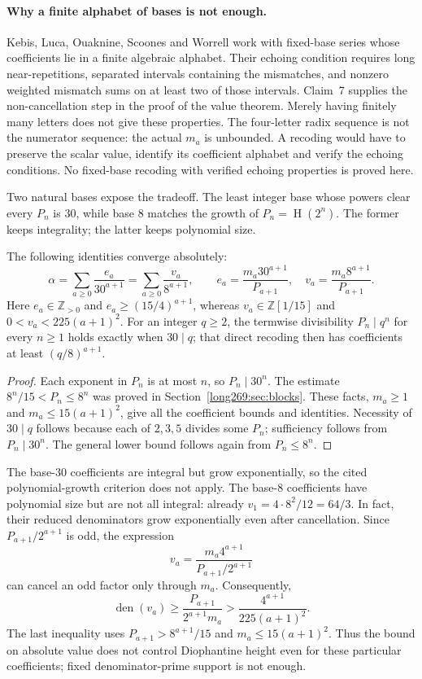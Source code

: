 \documentclass[11pt]{article}
\theoremstyle{remark}
\theoremstyle{plain}
\newcommand{\hgt}{\operatorname{H}}
\begin{document}
\paragraph{Why a finite alphabet of bases is not enough.}
Kebis, Luca, Ouaknine, Scoones and Worrell
\cite[Definition~3, Theorem~6 and Claim~7]{kebis2024echoing}
work with fixed-base series whose coefficients lie in a finite algebraic
alphabet.  Their echoing condition requires long near-repetitions,
separated intervals containing the mismatches, and nonzero weighted
mismatch sums on at least two of those intervals.  Claim~7 supplies the
non-cancellation step in the proof of the value theorem.  Merely having
finitely many letters does not give these properties.
The four-letter radix sequence is not the numerator sequence: the actual
$m_a$ is unbounded.  A recoding would have to preserve the scalar value,
identify its coefficient alphabet and verify the echoing conditions.
No fixed-base recoding with verified echoing properties is proved here.

Two natural bases expose the tradeoff.  The least integer base whose
powers clear every $P_n$ is $30$, while base $8$ matches the growth of
$P_n=\hgt(2^n)$.  The former keeps integrality; the latter keeps polynomial
size.

\begin{proposition}
\label{long269:res:fixed-base-recoding}
The following identities converge absolutely:
\[
 \alpha=\sum_{a\ge0}\frac{e_a}{30^{a+1}}
        =\sum_{a\ge0}\frac{v_a}{8^{a+1}},\qquad
 e_a=\frac{m_a30^{a+1}}{P_{a+1}},\quad
 v_a=\frac{m_a8^{a+1}}{P_{a+1}}.
\]
Here $e_a\in\mathbb Z_{>0}$ and $e_a\ge(15/4)^{a+1}$, whereas
$v_a\in\mathbb Z[1/15]$ and $0<v_a<225(a+1)^2$.
For an integer $q\ge2$, the termwise divisibility $P_n\mid q^n$ for every
$n\ge1$ holds exactly when $30\mid q$; that direct recoding then has
coefficients at least $(q/8)^{a+1}$.
\end{proposition}
\begin{proof}
Each exponent in $P_n$ is at most $n$, so $P_n\mid30^n$.  The estimate
$8^n/15<P_n\le8^n$ was proved in Section~\ref{long269:sec:blocks}.
These facts, $m_a\ge1$ and
$m_a\le15(a+1)^2$, give all the coefficient bounds and identities.
Necessity of $30\mid q$ follows because each of $2,3,5$ divides some $P_n$;
sufficiency follows from $P_n\mid30^n$.  The general lower bound follows
again from $P_n\le8^n$.
\end{proof}
The base-$30$ coefficients are integral but grow exponentially, so the
cited polynomial-growth criterion does not apply.  The base-$8$
coefficients have polynomial size but are not all integral: already
$v_1=4\cdot8^2/12=64/3$.  In fact, their reduced denominators grow
exponentially even after cancellation.  Since $P_{a+1}/2^{a+1}$ is odd,
the expression
\[
 v_a=\frac{m_a4^{a+1}}{P_{a+1}/2^{a+1}}
\]
can cancel an odd factor only through $m_a$.  Consequently,
\[
 \operatorname{den}(v_a)
 \ge \frac{P_{a+1}}{2^{a+1}m_a}
 >\frac{4^{a+1}}{225(a+1)^2}.
\]
The last inequality uses $P_{a+1}>8^{a+1}/15$ and
$m_a\le15(a+1)^2$.  Thus the bound on absolute value does not control
Diophantine height even for these particular coefficients; fixed
denominator-prime support is not enough.
\end{document}
